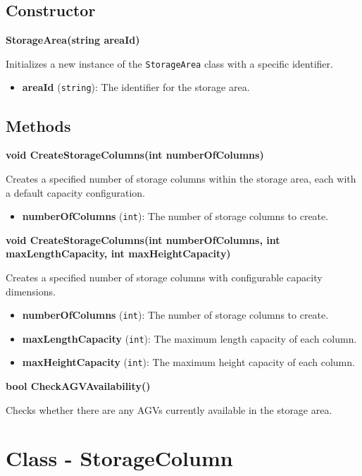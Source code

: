 \documentclass[12pt]{article}
\begin{document}
\subsection*{Constructor}

\textbf{StorageArea(string areaId)}

Initializes a new instance of the \texttt{StorageArea} class with a specific identifier.

\begin{itemize}
    \item \textbf{areaId} (\texttt{string}): The identifier for the storage area.
\end{itemize}

\subsection*{Methods}

\textbf{void CreateStorageColumns(int numberOfColumns)}

Creates a specified number of storage columns within the storage area, each with a default capacity configuration.

\begin{itemize}
    \item \textbf{numberOfColumns} (\texttt{int}): The number of storage columns to create.
\end{itemize}

\textbf{void CreateStorageColumns(int numberOfColumns, int maxLengthCapacity, int maxHeightCapacity)}

Creates a specified number of storage columns with configurable capacity dimensions.

\begin{itemize}
    \item \textbf{numberOfColumns} (\texttt{int}): The number of storage columns to create.
    \item \textbf{maxLengthCapacity} (\texttt{int}): The maximum length capacity of each column.
    \item \textbf{maxHeightCapacity} (\texttt{int}): The maximum height capacity of each column.
\end{itemize}

\textbf{bool CheckAGVAvailability()}

Checks whether there are any AGVs currently available in the storage area.

\newpage
\section*{Class - StorageColumn}
\end{document}

